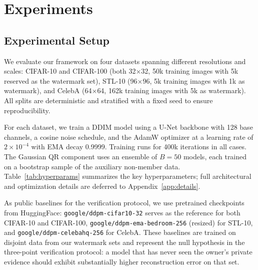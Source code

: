 \documentclass[sigconf, review, anonymous]{acmart}
\begin{document}
\section{Experiments}
\label{sec:experiments}

\subsection{Experimental Setup}
\label{sec:setup}

We evaluate our framework on four datasets spanning different resolutions and scales: CIFAR-10 and CIFAR-100 (both 32$\times$32, 50k training images with 5k reserved as the watermark set), STL-10 (96$\times$96, 5k training images with 1k as watermark), and CelebA (64$\times$64, 162k training images with 5k as watermark). All splits are deterministic and stratified with a fixed seed to ensure reproducibility.

For each dataset, we train a DDIM model using a U-Net backbone with 128 base channels, a cosine noise schedule, and the AdamW optimizer at a learning rate of $2\times10^{-4}$ with EMA decay 0.9999. Training runs for 400k iterations in all cases. The Gaussian QR component uses an ensemble of $B{=}50$ models, each trained on a bootstrap sample of the auxiliary non-member data. Table~\ref{tab:hyperparams} summarizes the key hyperparameters; full architectural and optimization details are deferred to Appendix~\ref{app:details}.

As public baselines for the verification protocol, we use pretrained checkpoints from HuggingFace: \texttt{google/ddpm-cifar10-32} serves as the reference for both CIFAR-10 and CIFAR-100, \texttt{google/ddpm-ema-bedroom-256} (resized) for STL-10, and \texttt{google/ddpm-celebahq-256} for CelebA. These baselines are trained on disjoint data from our watermark sets and represent the null hypothesis in the three-point verification protocol: a model that has never seen the owner's private evidence should exhibit substantially higher reconstruction error on that set.
\end{document}
